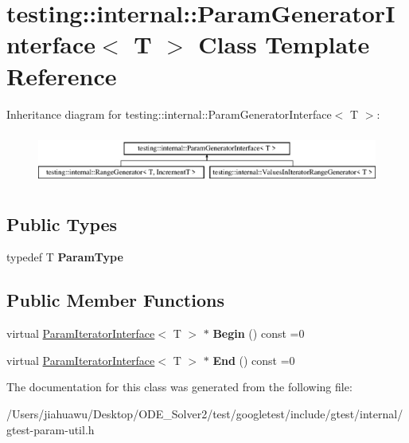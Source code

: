 \hypertarget{classtesting_1_1internal_1_1_param_generator_interface}{}\section{testing\+:\+:internal\+:\+:Param\+Generator\+Interface$<$ T $>$ Class Template Reference}
\label{classtesting_1_1internal_1_1_param_generator_interface}
Inheritance diagram for testing\+:\+:internal\+:\+:Param\+Generator\+Interface$<$ T $>$\+:\begin{figure}[H]
\begin{center}
\leavevmode
\includegraphics[height=1.733746cm]{classtesting_1_1internal_1_1_param_generator_interface}
\end{center}
\end{figure}
\subsection*{Public Types}
\begin{DoxyCompactItemize}
\item 
\mbox{\label{classtesting_1_1internal_1_1_param_generator_interface_ab33d2ea424c50beaf503cb125b3cd003}} 
typedef T {\bfseries Param\+Type}
\end{DoxyCompactItemize}
\subsection*{Public Member Functions}
\begin{DoxyCompactItemize}
\item 
\mbox{\label{classtesting_1_1internal_1_1_param_generator_interface_ae1de83b16fe9a53c67778a026c6a9569}} 
virtual \mbox{\hyperlink{classtesting_1_1internal_1_1_param_iterator_interface}{Param\+Iterator\+Interface}}$<$ T $>$ $\ast$ {\bfseries Begin} () const =0
\item 
\mbox{\label{classtesting_1_1internal_1_1_param_generator_interface_afa7211b74990e11d3fc7ad4e7113da4f}} 
virtual \mbox{\hyperlink{classtesting_1_1internal_1_1_param_iterator_interface}{Param\+Iterator\+Interface}}$<$ T $>$ $\ast$ {\bfseries End} () const =0
\end{DoxyCompactItemize}


The documentation for this class was generated from the following file\+:\begin{DoxyCompactItemize}
\item 
/\+Users/jiahuawu/\+Desktop/\+O\+D\+E\+\_\+\+Solver2/test/googletest/include/gtest/internal/gtest-\/param-\/util.\+h\end{DoxyCompactItemize}
